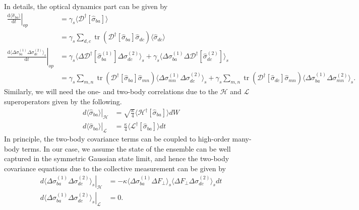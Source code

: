 \documentclass[preprint,aps,pra,onecolumn,superscriptaddress]{revtex4-1} %
\DeclareMathOperator{\tr}{tr}
\newcommand{\dt}[1]{\frac{{\mathrm d} {#1}}{{\mathrm d}t}}
\newcommand{\expect}[1]{\big\langle #1 \big\rangle}
\begin{document}
In details, the optical dynamics part can be given by
\begin{align}
\left. \dt{\expect{\hat{\sigma}_{ba}}}\right|_{op} &= \gamma_s\expect{\mathcal{D}^\dagger \left[ \hat{\sigma}_{ba}\right]}\\
&= \gamma_s\sum_{d,c}\tr\left(\mathcal{D}^\dagger \left[ \hat{\sigma}_{ba}\right]\hat{\sigma}_{dc} \right)\expect{\hat{\sigma}_{dc} }\\
\left. \dt{\expect{\Delta \sigma_{ba}^{(1)}\Delta \sigma_{dc}^{(2)}}_s}\right|_{op} &=\gamma_s\expect{\Delta\mathcal{D}^\dagger[\hat{\sigma}_{ba}^{(1)}]\Delta\sigma_{dc}^{(2)} }_s + \gamma_s\expect{\Delta\sigma_{ba}^{(1)}\Delta\mathcal{D}^\dagger[\hat{\sigma}_{dc}^{(2)}] }_s\\
&= \gamma_s\sum_{m,n}\tr\left(\mathcal{D}^\dagger[\hat{\sigma}_{ba}]\hat{\sigma}_{mn} \right)\expect{\Delta \sigma_{mn}^{(1)}\Delta \sigma_{dc}^{(2)} }_s + \gamma_s\sum_{m,n}\tr\left(\mathcal{D}^\dagger[\hat{\sigma}_{dc}]\hat{\sigma}_{mn} \right) \expect{\Delta \sigma_{ba}^{(1)}\Delta \sigma_{mn}^{(2)} }_s.
\end{align} 
Similarly, we will need the one- and two-body correlations due to the $ \mathcal{H} $ and $ \mathcal{L} $ superoperators given by the following.
\begin{subequations}
\begin{align}
\left.d\expect{\hat{\sigma}_{ba}}\right|_\mathcal{H} &=\sqrt{\frac{\kappa}{4}}\expect{\mathcal{H}^\dagger\left[\hat{\sigma}_{ba} \right]}dW \\
\left.d\expect{\hat{\sigma}_{ba}}\right|_\mathcal{L} &= \frac{\kappa}{4}\expect{\mathcal{L}^\dagger\left[\hat{\sigma}_{ba} \right]}dt
\end{align}
\end{subequations}
In principle, the two-body covariance terms can be coupled to high-order many-body terms. 
In our case, we assume the state of the ensemble can be well captured in the symmetric Gaussian state limit, and hence the two-body covariance equations due to the collective measurement can be given by
\begin{subequations}
\begin{align}
\left.d\expect{\Delta \sigma_{ba}^{(1)} \Delta \sigma_{dc}^{(2)}}_s \right|_\mathcal{H} &= -\kappa\expect{\Delta\sigma_{ba}^{(1)}\Delta F_\perp }_s \expect{\Delta F_\perp \Delta \sigma_{dc}^{(2)} }_s dt \\
\left.d\expect{\Delta \sigma_{ba}^{(1)} \Delta \sigma_{dc}^{(2)}}_s\right|_\mathcal{L} &= 0.
\end{align}
\end{subequations}
\end{document}
